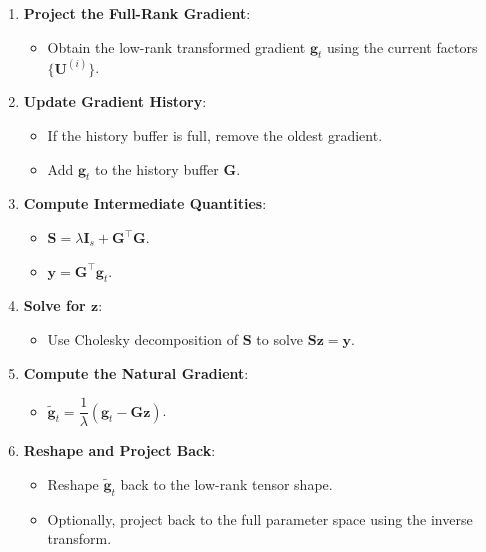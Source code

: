 \begin{enumerate}
    \item \textbf{Project the Full-Rank Gradient}:

    \begin{itemize}
        \item Obtain the low-rank transformed gradient $\boldsymbol{g}_t$ using the current factors $\{\mathbf{U}^{(i)}\}$.
    \end{itemize}

    \item \textbf{Update Gradient History}:

    \begin{itemize}
        \item If the history buffer is full, remove the oldest gradient.
        \item Add $\boldsymbol{g}_t$ to the history buffer $\mathbf{G}$.
    \end{itemize}

    \item \textbf{Compute Intermediate Quantities}:

    \begin{itemize}
        \item $\mathbf{S} = \lambda \mathbf{I}_s + \mathbf{G}^\top \mathbf{G}$.
        \item $\boldsymbol{y} = \mathbf{G}^\top \boldsymbol{g}_t$.
    \end{itemize}

    \item \textbf{Solve for $\boldsymbol{z}$}:

    \begin{itemize}
        \item Use Cholesky decomposition of $\mathbf{S}$ to solve $\mathbf{S} \boldsymbol{z} = \boldsymbol{y}$.
    \end{itemize}

    \item \textbf{Compute the Natural Gradient}:

    \begin{itemize}
        \item $\tilde{\boldsymbol{g}}_t = \dfrac{1}{\lambda} \left( \boldsymbol{g}_t - \mathbf{G} \boldsymbol{z} \right)$.
    \end{itemize}

    \item \textbf{Reshape and Project Back}:

    \begin{itemize}
        \item Reshape $\tilde{\boldsymbol{g}}_t$ back to the low-rank tensor shape.
        \item Optionally, project back to the full parameter space using the inverse transform.
    \end{itemize}
\end{enumerate}

